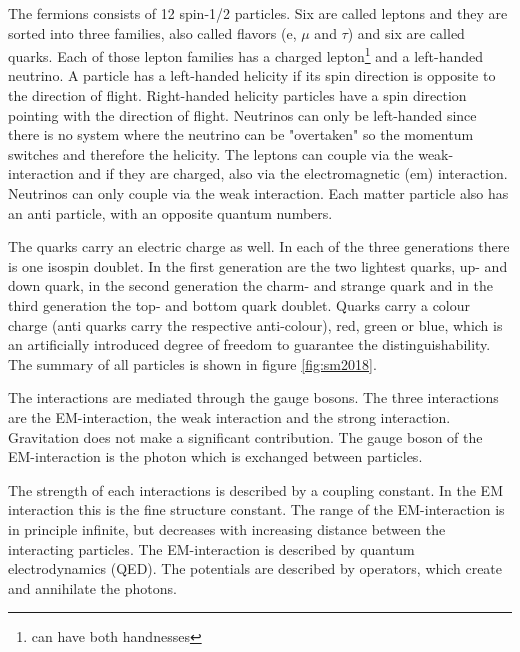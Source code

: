 The fermions consists of 12 spin-1/2 particles. Six are called leptons and they are sorted into three families, also called flavors (e, $\mu$ and $\tau$) and six are called quarks. Each of those lepton families has a charged lepton\footnote{can have both handnesses} and a left-handed neutrino.
A particle has a left-handed helicity if its spin direction is opposite to the direction of flight. Right-handed helicity particles have a spin direction pointing with the direction of flight.
Neutrinos can only be left-handed since there is no system where the neutrino can be "overtaken" so the momentum switches and therefore the helicity.
The leptons can couple via the weak-interaction and if they are charged, also via the electromagnetic (em) interaction. Neutrinos can only couple via the weak interaction.
Each matter particle also has an anti particle, with an opposite quantum numbers.

The quarks carry an electric charge as well. In each of the three generations there is one isospin doublet. In the first generation are the two lightest quarks,
up- and down quark, in the second generation the charm- and strange quark and
in the third generation the top- and bottom quark doublet.
Quarks carry a colour charge (anti quarks carry the respective anti-colour), red, green or blue, which is an artificially introduced degree of freedom to guarantee the distinguishability.
The summary of all particles is shown in figure \ref{fig:sm2018}.

The interactions are mediated through the gauge bosons.
The three interactions are the EM-interaction,
the weak interaction and the strong interaction. Gravitation does not make a significant contribution.
The gauge boson of the EM-interaction is the photon which is exchanged between particles.

The strength of each interactions is
described by a coupling constant. In the EM interaction this is the
fine structure constant\cite{alphas}. The range of the EM-interaction is in principle
infinite, but decreases with increasing distance between the interacting particles.
The EM-interaction is described by quantum electrodynamics (QED).
The potentials are described by operators, which create and annihilate the photons.

